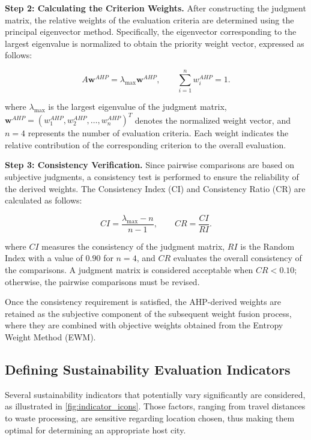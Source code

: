 \documentclass{mcmthesis}
\begin{document}
\noindent\textbf{Step 2: Calculating the Criterion Weights.}
After constructing the judgment matrix, the relative weights of the evaluation criteria are determined using the principal eigenvector method. Specifically, the eigenvector corresponding to the largest eigenvalue is normalized to obtain the priority weight vector, expressed as follows:

\begin{equation}
A\mathbf{w}^{AHP}
=
\lambda_{\max}\mathbf{w}^{AHP},
\qquad
\sum_{i=1}^{n}w_i^{AHP}=1.
\end{equation}

where $\lambda_{\max}$ is the largest eigenvalue of the judgment matrix, $\mathbf{w}^{AHP}=(w_1^{AHP},w_2^{AHP},\ldots,w_n^{AHP})^{T}$ denotes the normalized weight vector, and $n=4$ represents the number of evaluation criteria. Each weight indicates the relative contribution of the corresponding criterion to the overall evaluation.

\noindent\textbf{Step 3: Consistency Verification.}
Since pairwise comparisons are based on subjective judgments, a consistency test is performed to ensure the reliability of the derived weights. The Consistency Index (CI) and Consistency Ratio (CR) are calculated as follows:

\begin{equation}
CI=\frac{\lambda_{\max}-n}{n-1},
\qquad
CR=\frac{CI}{RI}.
\end{equation}

where $CI$ measures the consistency of the judgment matrix, $RI$ is the Random Index with a value of $0.90$ for $n=4$, and $CR$ evaluates the overall consistency of the comparisons. A judgment matrix is considered acceptable when $CR<0.10$; otherwise, the pairwise comparisons must be revised.

Once the consistency requirement is satisfied, the AHP-derived weights are retained as the subjective component of the subsequent weight fusion process, where they are combined with objective weights obtained from the Entropy Weight Method (EWM).


\subsection{Defining Sustainability Evaluation Indicators} \label{subsec:defining_indicators}

Several sustainability indicators that potentially vary significantly are considered, as illustrated in \cref{fig:indicator_icons}. Those factors, ranging from travel distances to waste processing, are sensitive regarding location chosen, thus making them optimal for determining an appropriate host city. 
\end{document}

